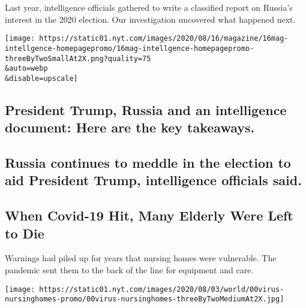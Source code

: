 Last year, intelligence officials gathered to write a classified report
on Russia's interest in the 2020 election. Our investigation uncovered
what happened next.

\href{/2020/08/08/magazine/us-russia-intelligence.html}{}

\texttt{[image: https://static01.nyt.com/images/2020/08/16/magazine/16mag-intellgence-homepagepromo/16mag-intellgence-homepagepromo-threeByTwoSmallAt2X.png?quality=75\\\&auto=webp\\\&disable=upscale]}

\href{/2020/08/08/us/politics/trump-russia.html}{}

\hypertarget{president-trump-russia-and-an-intelligence-document-here-are-the-key-takeaways}{%
\subsection{President Trump, Russia and an intelligence document: Here
are the key
takeaways.}\label{president-trump-russia-and-an-intelligence-document-here-are-the-key-takeaways}}

\href{/2020/08/07/us/politics/russia-china-trump-biden-election-interference.html}{}

\hypertarget{russia-continues-to-meddle-in-the-election-to-aid-president-trump-intelligence-officials-said}{%
\subsection{Russia continues to meddle in the election to aid President
Trump, intelligence officials
said.}\label{russia-continues-to-meddle-in-the-election-to-aid-president-trump-intelligence-officials-said}}

\href{/2020/08/08/world/europe/coronavirus-nursing-homes-elderly.html}{}

\hypertarget{when-covid-19-hit-many-elderly-were-left-to-die}{%
\subsection{When Covid-19 Hit, Many Elderly Were Left to
Die}\label{when-covid-19-hit-many-elderly-were-left-to-die}}

Warnings had piled up for years that nursing homes were vulnerable. The
pandemic sent them to the back of the line for equipment and care.

\href{/2020/08/08/world/europe/coronavirus-nursing-homes-elderly.html}{}

\texttt{[image: https://static01.nyt.com/images/2020/08/03/world/00virus-nursinghomes-promo/00virus-nursinghomes-threeByTwoMediumAt2X.jpg]}

